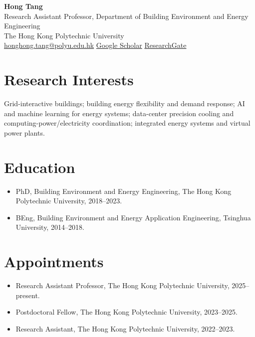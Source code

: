 \documentclass[11pt,a4paper]{article}
\begin{document}
\begin{center}
{\Large\textbf{Hong Tang}}\\
Research Assistant Professor, Department of Building Environment and Energy Engineering\\
The Hong Kong Polytechnic University\\
\href{mailto:honghong.tang@polyu.edu.hk}{honghong.tang@polyu.edu.hk} \quad
\href{https://scholar.google.com.hk/citations?user=nXW7KrwAAAAJ&hl=en}{Google Scholar} \quad
\href{https://www.researchgate.net/profile/Hong-Tang-17}{ResearchGate}
\end{center}

\section*{Research Interests}
Grid-interactive buildings; building energy flexibility and demand response; AI and machine learning for energy systems; data-center precision cooling and computing-power/electricity coordination; integrated energy systems and virtual power plants.

\section*{Education}
\begin{itemize}
\item PhD, Building Environment and Energy Engineering, The Hong Kong Polytechnic University, 2018--2023.
\item BEng, Building Environment and Energy Application Engineering, Tsinghua University, 2014--2018.
\end{itemize}

\section*{Appointments}
\begin{itemize}
\item Research Assistant Professor, The Hong Kong Polytechnic University, 2025--present.
\item Postdoctoral Fellow, The Hong Kong Polytechnic University, 2023--2025.
\item Research Assistant, The Hong Kong Polytechnic University, 2022--2023.
\end{itemize}
\end{document}
